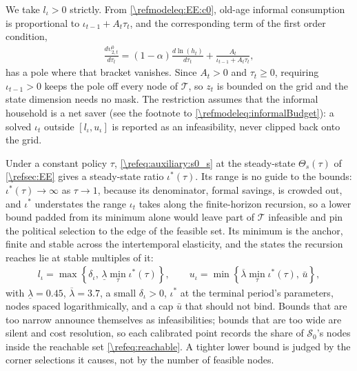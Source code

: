 We take $l_{\iota}>0$ strictly. From \eqref{\refmodeleq:EE:c0}, old-age informal consumption is proportional to $\iota_{t-1}+A_t\tau_t$, and the corresponding term of the first order condition,
\begin{align}\label{\refeq:dv20}
    \frac{d\upsilon_{2,t}^0}{d\tau_t} = (1-\alpha)\frac{d\ln\left(h_t\right)}{d\tau_t}+\frac{A_t}{\iota_{t-1}+A_t\tau_t},
\end{align}
has a pole where that bracket vanishes. Since $A_t>0$ and $\tau_t\geq 0$, requiring $\iota_{t-1}>0$ keeps the pole off every node of $\mathcal{T}$, so $z_t$ is bounded on the grid and the state dimension needs no mask. The restriction assumes that the informal household is a net saver (see the footnote to \eqref{\refmodeleq:informalBudget}): a solved $\iota_t$ outside $[l_{\iota},u_{\iota}]$ is reported as an infeasibility, never clipped back onto the grid.

Under a constant policy $\tau$, \eqref{\refeq:auxiliary:s0_s} at the steady-state $\Theta_s(\tau)$ of \cref{\refsec:EE} gives a steady-state ratio $\iota^*(\tau)$. Its range is no guide to the bounds: $\iota^*(\tau)\rightarrow\infty$ as $\tau\rightarrow 1$, because its denominator, formal savings, is crowded out, and $\iota^*$ understates the range $\iota_t$ takes along the finite-horizon recursion, so a lower bound padded from its minimum alone would leave part of $\mathcal{T}$ infeasible and pin the political selection to the edge of the feasible set. Its minimum is the anchor, finite and stable across the intertemporal elasticity, and the states the recursion reaches lie at stable multiples of it:
\begin{align*}
    l_{\iota} = \max\left\lbrace\delta_{\iota},\, \underline{\lambda}\min_{\tau}\iota^*(\tau)\right\rbrace, \qquad
    u_{\iota} = \min\left\lbrace\overline{\lambda}\min_{\tau}\iota^*(\tau),\, \bar{u}\right\rbrace,
\end{align*}
with $\underline{\lambda} = 0.45$, $\overline{\lambda} = 3.7$, a small $\delta_{\iota}>0$, $\iota^*$ at the terminal period's parameters, nodes spaced logarithmically, and a cap $\bar{u}$ that should not bind. Bounds that are too narrow announce themselves as infeasibilities; bounds that are too wide are silent and cost resolution, so each calibrated point records the share of $\mathcal{S}_0$'s nodes inside the reachable set \eqref{\refeq:reachable}. A tighter lower bound is judged by the corner selections it causes, not by the number of feasible nodes.

